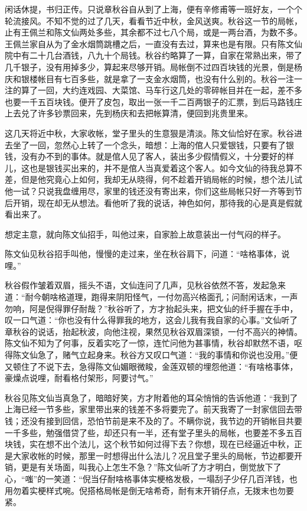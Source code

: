 \documentclass[12pt,UTF8]{ctexbook}
\begin{document}
{{{闲话休提，书归正传。只说章秋谷自从到了上海，便有辛修甫等一班好友，一个个轮流接风。不知不觉的过了几天，看看节近中秋，金风送爽。秋谷这一节的局帐，止有王佩兰和陈文仙两处多些，其余都不过七八个局，或是一两台酒，为数不多。王佩兰家自从为了金水烟筒跳槽之后，一直没有去过，算来也是有限。只有陈文仙院中有二十几台酒钱，八九十个局钱。秋谷约略算了一算，自家在常熟出来，带了几千银子，没有用掉多少，算起来尽够开销。局帐倒不过四百块钱的光景，倒是杨庆和银楼帐目有七百多些，就是拿了一支金水烟筒，也没有什么别的。秋谷一注一注的算了一回，大约连戏园、大菜馆、马车行这几处的零碎帐目并在一起，差不多也要一千五百块钱。便开了皮包，取出一张一千二百两银子的汇票，到后马路钱庄上去兑了许多钞票回来，先到杨庆和去把帐算清，便回到兆贵里来。

这几天将近中秋，大家收帐，堂子里头的生意狠是清淡。陈文仙恰好在家。秋谷进去坐了一回，忽然心上转了一个念头，暗想：上海的倌人只爱银钱，只要有了银钱，没有办不到的事体。就是倌人见了客人，装出多少假情假义，十分要好的样儿，这也是银钱买出来的，并不是倌人当真爱着这个客人。如今文仙的待我总算不差，但是他究竟心上如何，我却无从晓得，何不趁着开销局帐的时候，想个法儿试他一试？只说我盘缠用尽，家里的钱还没有寄出来，你们这些局帐只好一齐等到节后开销，现在却无从想法。看他听了我的说话，神色如何，那待我的心是真是假就看出来了。

想定主意，就向陈文仙招手，叫他过来，自家脸上故意装出一付气闷的样子。

陈文仙见秋谷招手叫他，慢慢的走过来，坐在秋谷肩下，问道：“啥格事体，说哩。”

秋谷假作皱着双眉，摇头不语，文仙连问了几声，见秋谷依然不答，发起急来道：“耐今朝啥格道理，跑得来阴阳怪气，一付勿高兴格面孔；问耐闲话末，一声勿响，阿是倪得罪仔耐哉？”秋谷听了，方才抬起头来，把文仙的纤手握在手中，叹一口气道：“你也没有什么得罪我的地方，这会儿我有我自家的心事。”文仙听了章秋谷的说话，抬起秋波，向他注视，果然见秋谷双眉深锁，一付不高兴的神情。陈文仙不知为了何事，反着实吃了一惊，连忙问他为甚事情，秋谷却默然不语，呕得陈文仙急了，赌气立起身来。秋谷方又叹口气道：“我的事情和你说也没用。”便又顿住了不说下去，急得陈文仙媚眼微睃，金莲双顿的埋怨他道：“有啥格事体，豪燥点说哩，耐看格付架形，阿要讨气。”

秋谷见陈文仙当真急了，暗暗好笑，方才附着他的耳朵悄悄的告诉他道：“我到了上海已经一节多些，家里带出来的钱差不多将要完了。前天我寄了一封家信回去带钱；还没有接到回信，恐怕节前是来不及的了。不瞒你说，我节边的开销帐目共要一千多些，勉强借贷了些，却还只有一半，还有堂子里头的局帐，也要差不多五百块钱，实在想不出个法儿，这个秋节如何过得下去？你想，现在已经逼近中秋，正是大家收帐的时候，那里一时想得出什么法儿？况且堂子里头的局帐，节边都要开销，更是有关场面，叫我心上怎生不急？”陈文仙听了方才明白，倒觉放下了心，“嗤”的一笑道：“倪当仔耐啥格事体实梗格发极，一塌刮子少仔几百洋钱，也用勿着实梗样式啘。倪搭格局帐是倒无啥希奇，耐有末开销仔点，无拨末也勿要紧。

}}}
\end{document}
